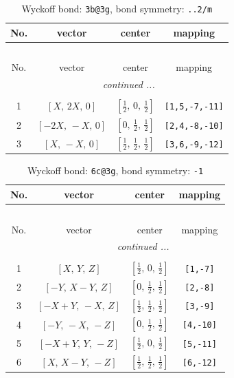 \documentclass[fleqn,8pt]{jsarticle}
\begin{document}
\renewcommand{\arraystretch}{1.2}
\begin{longtable}{cccc}
\caption{Wyckoff bond: {\tt 3b@3g}, bond symmetry: {\tt ..2/m}}
 \\
 \hline \hline
No. & vector & center & mapping \\ \hline \endfirsthead

\multicolumn{3}{l}{\tablename\ \thetable{}} \\
 \hline \hline
No. & vector & center & mapping \\ \hline \endhead

 \hline \hline
\multicolumn{3}{r}{\footnotesize\it continued ...} \\ \endfoot

 \hline \hline
\multicolumn{3}{r}{} \\ \endlastfoot

1 & $\left[ X,\, 2 X,\, 0 \right]$ & $\left[ \frac{1}{2},\, 0,\, \frac{1}{2} \right]$ & {\tt [1,5,-7,-11]} \\ \hline
2 & $\left[ - 2 X,\, - X,\, 0 \right]$ & $\left[ 0,\, \frac{1}{2},\, \frac{1}{2} \right]$ & {\tt [2,4,-8,-10]} \\ \hline
3 & $\left[ X,\, - X,\, 0 \right]$ & $\left[ \frac{1}{2},\, \frac{1}{2},\, \frac{1}{2} \right]$ & {\tt [3,6,-9,-12]} \\
\end{longtable}
\renewcommand{\arraystretch}{1.2}
\begin{longtable}{cccc}
\caption{Wyckoff bond: {\tt 6c@3g}, bond symmetry: {\tt -1}}
 \\
 \hline \hline
No. & vector & center & mapping \\ \hline \endfirsthead

\multicolumn{3}{l}{\tablename\ \thetable{}} \\
 \hline \hline
No. & vector & center & mapping \\ \hline \endhead

 \hline \hline
\multicolumn{3}{r}{\footnotesize\it continued ...} \\ \endfoot

 \hline \hline
\multicolumn{3}{r}{} \\ \endlastfoot

1 & $\left[ X,\, Y,\, Z \right]$ & $\left[ \frac{1}{2},\, 0,\, \frac{1}{2} \right]$ & {\tt [1,-7]} \\ \hline
2 & $\left[ - Y,\, X - Y,\, Z \right]$ & $\left[ 0,\, \frac{1}{2},\, \frac{1}{2} \right]$ & {\tt [2,-8]} \\ \hline
3 & $\left[ - X + Y,\, - X,\, Z \right]$ & $\left[ \frac{1}{2},\, \frac{1}{2},\, \frac{1}{2} \right]$ & {\tt [3,-9]} \\ \hline
4 & $\left[ - Y,\, - X,\, - Z \right]$ & $\left[ 0,\, \frac{1}{2},\, \frac{1}{2} \right]$ & {\tt [4,-10]} \\ \hline
5 & $\left[ - X + Y,\, Y,\, - Z \right]$ & $\left[ \frac{1}{2},\, 0,\, \frac{1}{2} \right]$ & {\tt [5,-11]} \\ \hline
6 & $\left[ X,\, X - Y,\, - Z \right]$ & $\left[ \frac{1}{2},\, \frac{1}{2},\, \frac{1}{2} \right]$ & {\tt [6,-12]} \\
\end{longtable}
\end{document}
